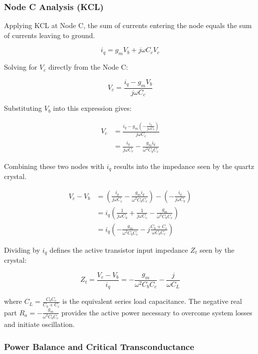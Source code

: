 \subsubsection*{Node C Analysis (KCL)}
Applying KCL at Node C, the sum of currents entering the node equals the sum of currents leaving to ground.

\begin{equation}
	i_q = g_m V_b + j\omega C_c V_c
\end{equation}

Solving for $V_c$ directly from the Node C:

\begin{equation}
	V_c = \frac{i_q - g_m V_b}{j\omega C_c}
\end{equation}

Substituting $V_b$ into this expression gives:

\begin{align}
	V_c &= \frac{i_q - g_m \left(-\frac{i_q}{j\omega C_b}\right)}{j\omega C_c} \nonumber \\
	&= \frac{i_q}{j\omega C_c} - \frac{g_m i_q}{\omega^2 C_b C_c}
\end{align}

Combining these two nodes with $i_q$ results into the impedance seen by the quartz crystal.

\begin{align}
	V_c - V_b &= \left( \frac{i_q}{j\omega C_c} - \frac{g_m i_q}{\omega^2 C_b C_c} \right) - \left( -\frac{i_q}{j\omega C_b} \right) \nonumber \\
	&= i_q \left( \frac{1}{j\omega C_b} + \frac{1}{j\omega C_c} - \frac{g_m}{\omega^2 C_b C_c} \right) \nonumber \\
	&= i_q \left( -\frac{g_m}{\omega^2 C_b C_c} - j \frac{C_b + C_c}{\omega C_b C_c} \right)
\end{align}

Dividing by $i_q$ defines the active transistor input impedance $Z_t$ seen by the crystal:

\begin{equation}
	Z_t = \frac{V_c - V_b}{i_q} = -\frac{g_m}{\omega^2 C_b C_c} - \frac{j}{\omega C_L}
\end{equation}

where $C_L = \frac{C_b C_c}{C_b + C_c}$ is the equivalent series load capacitance. The negative real part $R_a = -\frac{g_m}{\omega^2 C_b C_c}$ provides the active power necessary to overcome system losses and initiate oscillation.

\subsubsection*{Power Balance and Critical Transconductance}

